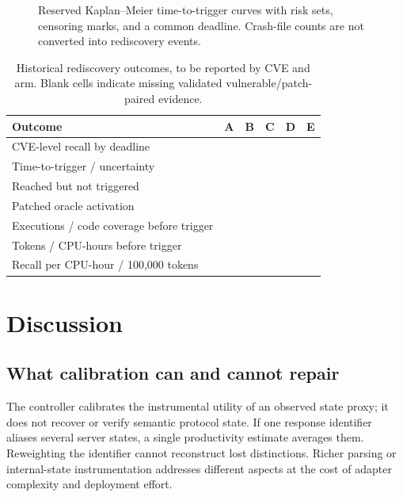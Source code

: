\documentclass[final,5p,times,number]{elsarticle}
\newcommand{\missing}{\mbox{}}
\newcommand{\blankpanel}[1]{\fbox{\begin{minipage}[c][#1][c]{0.93\linewidth}\mbox{}\end{minipage}}}
\begin{document}
\begin{figure}[t]
\centering\blankpanel{28mm}
\caption{Reserved Kaplan--Meier time-to-trigger curves with risk sets, censoring marks, and a common deadline. Crash-file counts are not converted into rediscovery events.}
\label{fig:km}
\end{figure}

\begin{table}[t]
\centering\small
\caption{Historical rediscovery outcomes, to be reported by CVE and arm. Blank cells indicate missing validated vulnerable/patch-paired evidence.}
\label{tab:cveresults}
\begin{tabularx}{\textwidth}{Y *{5}{>{\centering\arraybackslash}X}}
\toprule
Outcome & A & B & C & D & E \\
\midrule
CVE-level recall by deadline & \missing & \missing & \missing & \missing & \missing \\
Time-to-trigger / uncertainty & \missing & \missing & \missing & \missing & \missing \\
Reached but not triggered & \missing & \missing & \missing & \missing & \missing \\
Patched oracle activation & \missing & \missing & \missing & \missing & \missing \\
Executions / code coverage before trigger & \missing & \missing & \missing & \missing & \missing \\
Tokens / CPU-hours before trigger & \missing & \missing & \missing & \missing & \missing \\
Recall per CPU-hour / 100,000 tokens & \missing & \missing & \missing & \missing & \missing \\
\bottomrule
\end{tabularx}
\end{table}

\section{Discussion}
\subsection{What calibration can and cannot repair}
The controller calibrates the instrumental utility of an observed state proxy; it does not recover or verify semantic protocol state. If one response identifier aliases several server states, a single productivity estimate averages them. Reweighting the identifier cannot reconstruct lost distinctions. Richer parsing or internal-state instrumentation addresses different aspects at the cost of adapter complexity and deployment effort.
\end{document}
